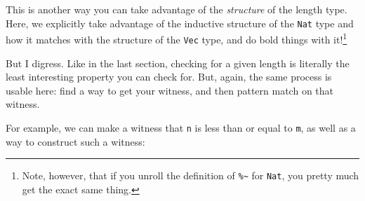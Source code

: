 \documentclass[]{article}
\newenvironment{Shaded}{}{}
\newcommand{\CommentTok}[1]{\textcolor[rgb]{0.38,0.63,0.69}{\textit{#1}}}
\newcommand{\DataTypeTok}[1]{\textcolor[rgb]{0.56,0.13,0.00}{#1}}
\newcommand{\KeywordTok}[1]{\textcolor[rgb]{0.00,0.44,0.13}{\textbf{#1}}}
\newcommand{\NormalTok}[1]{#1}
\newcommand{\OperatorTok}[1]{\textcolor[rgb]{0.40,0.40,0.40}{#1}}
\newcommand{\OtherTok}[1]{\textcolor[rgb]{0.00,0.44,0.13}{#1}}
\begin{document}
This is another way you can take advantage of the \emph{structure} of the length
type. Here, we explicitly take advantage of the inductive structure of the
\texttt{Nat} type and how it matches with the structure of the \texttt{Vec}
type, and do bold things with it!\footnote{Note, however, that if you unroll the
  definition of \texttt{\%\textasciitilde{}} for \texttt{Nat}, you pretty much
  get the exact same thing.}

But I digress. Like in the last section, checking for a given length is
literally the least interesting property you can check for. But, again, the same
process is usable here: find a way to get your witness, and then pattern match
on that witness.

For example, we can make a witness that \texttt{n} is less than or equal to
\texttt{m}, as well as a way to construct such a witness:

\begin{Shaded}
\end{Shaded}
\end{document}
